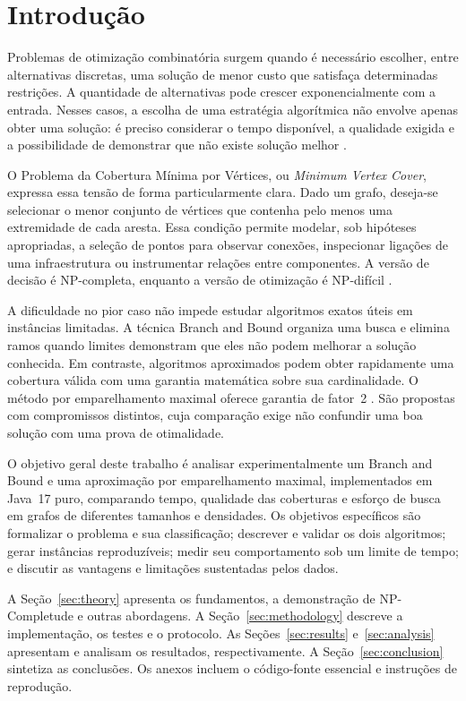 \section{Introdução}
\label{sec:introduction}

Problemas de otimização combinatória surgem quando é necessário escolher,
entre alternativas discretas, uma solução de menor custo que satisfaça
determinadas restrições. A quantidade de alternativas pode crescer
exponencialmente com a entrada. Nesses casos, a escolha de uma estratégia
algorítmica não envolve apenas obter uma solução: é preciso considerar
o tempo disponível, a qualidade exigida e a possibilidade de demonstrar
que não existe solução melhor \cite{cormen2022,fomin2010}.

O Problema da Cobertura Mínima por Vértices, ou \emph{Minimum Vertex Cover},
expressa essa tensão de forma particularmente clara. Dado um grafo, deseja-se
selecionar o menor conjunto de vértices que contenha pelo menos uma
extremidade de cada aresta. Essa condição permite modelar, sob hipóteses
apropriadas, a seleção de pontos para observar conexões, inspecionar
ligações de uma infraestrutura ou instrumentar relações entre componentes.
A versão de decisão é NP-completa, enquanto a versão de otimização é
NP-difícil \cite{karp1972,garey1979}.

A dificuldade no pior caso não impede estudar algoritmos exatos úteis em
instâncias limitadas. A técnica Branch and Bound organiza uma busca e
elimina ramos quando limites demonstram que eles não podem melhorar a
solução conhecida. Em contraste, algoritmos aproximados podem obter
rapidamente uma cobertura válida com uma garantia matemática sobre sua
cardinalidade. O método por emparelhamento maximal oferece garantia de
fator~2 \cite{cormen2022,vazirani2001}. São propostas com compromissos
distintos, cuja comparação exige não confundir uma boa solução com uma
prova de otimalidade.

O objetivo geral deste trabalho é analisar experimentalmente um Branch
and Bound e uma aproximação por emparelhamento maximal, implementados
em Java~17 puro, comparando tempo, qualidade das coberturas e esforço de
busca em grafos de diferentes tamanhos e densidades. Os objetivos
específicos são formalizar o problema e sua classificação; descrever e
validar os dois algoritmos; gerar instâncias reproduzíveis; medir seu
comportamento sob um limite de tempo; e discutir as vantagens e
limitações sustentadas pelos dados.

A Seção~\ref{sec:theory} apresenta os fundamentos, a demonstração de
NP-Completude e outras abordagens. A Seção~\ref{sec:methodology} descreve
a implementação, os testes e o protocolo. As Seções~\ref{sec:results}
e~\ref{sec:analysis} apresentam e analisam os resultados, respectivamente.
A Seção~\ref{sec:conclusion} sintetiza as conclusões. Os anexos incluem
o código-fonte essencial e instruções de reprodução.
